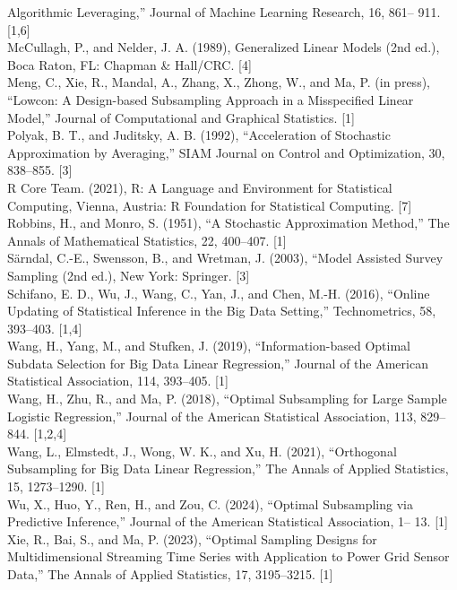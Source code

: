 \documentclass[
  10
]{article}
\begin{document}
Algorithmic Leveraging,'' Journal of Machine Learning Research, 16,
861-- 911. {[}1,6{]}\\
McCullagh, P., and Nelder, J. A. (1989), Generalized Linear Models (2nd
ed.), Boca Raton, FL: Chapman \& Hall/CRC. {[}4{]}\\
Meng, C., Xie, R., Mandal, A., Zhang, X., Zhong, W., and Ma, P. (in
press), ``Lowcon: A Design-based Subsampling Approach in a Misspecified
Linear Model,'' Journal of Computational and Graphical Statistics.
{[}1{]}\\
Polyak, B. T., and Juditsky, A. B. (1992), ``Acceleration of Stochastic
Approximation by Averaging,'' SIAM Journal on Control and Optimization,
30, 838--855. {[}3{]}\\
R Core Team. (2021), R: A Language and Environment for Statistical
Computing, Vienna, Austria: R Foundation for Statistical Computing.
{[}7{]}\\
Robbins, H., and Monro, S. (1951), ``A Stochastic Approximation
Method,'' The Annals of Mathematical Statistics, 22, 400--407. {[}1{]}\\
Särndal, C.-E., Swensson, B., and Wretman, J. (2003), ``Model Assisted
Survey Sampling (2nd ed.), New York: Springer. {[}3{]}\\
Schifano, E. D., Wu, J., Wang, C., Yan, J., and Chen, M.-H. (2016),
``Online Updating of Statistical Inference in the Big Data Setting,''
Technometrics, 58, 393--403. {[}1,4{]}\\
Wang, H., Yang, M., and Stufken, J. (2019), ``Information-based Optimal
Subdata Selection for Big Data Linear Regression,'' Journal of the
American Statistical Association, 114, 393--405. {[}1{]}\\
Wang, H., Zhu, R., and Ma, P. (2018), ``Optimal Subsampling for Large
Sample Logistic Regression,'' Journal of the American Statistical
Association, 113, 829--844. {[}1,2,4{]}\\
Wang, L., Elmstedt, J., Wong, W. K., and Xu, H. (2021), ``Orthogonal
Subsampling for Big Data Linear Regression,'' The Annals of Applied
Statistics, 15, 1273--1290. {[}1{]}\\
Wu, X., Huo, Y., Ren, H., and Zou, C. (2024), ``Optimal Subsampling via
Predictive Inference,'' Journal of the American Statistical Association,
1-- 13. {[}1{]}\\
Xie, R., Bai, S., and Ma, P. (2023), ``Optimal Sampling Designs for
Multidimensional Streaming Time Series with Application to Power Grid
Sensor Data,'' The Annals of Applied Statistics, 17, 3195--3215.
{[}1{]}\\
\end{document}
